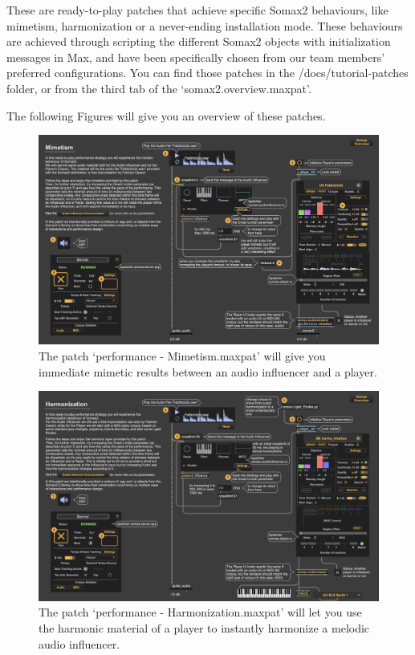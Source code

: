 These are ready-to-play patches that achieve specific Somax2 behaviours, like mimetism, harmonization or a never-ending installation mode. These behaviours are achieved through scripting the different Somax2 objects with initialization messages in Max, and have been specifically chosen from our team members' preferred configurations. You can find those patches in the /docs/tutorial-patches folder, or from the third tab of the `somax2.overview.maxpat'.

The following Figures will give you an overview of these patches.

\vspace{20mm}

 \begin{figure}[H]
    \centering        
 	\includegraphics[width=1\textwidth]{img/mimetism.png}
    \caption{The patch `performance - Mimetism.maxpat' will give you immediate mimetic results between an audio influencer and a player.}
    \label{fig:mimetism}
\end{figure}

\begin{figure}[H]
    \centering        
 	\includegraphics[width=1\textwidth]{img/harmonization.png}
    \caption{The patch `performance - Harmonization.maxpat' will let you use the harmonic material of a player to instantly harmonize a melodic audio influencer.}
    \label{fig:harmonization}
\end{figure}

